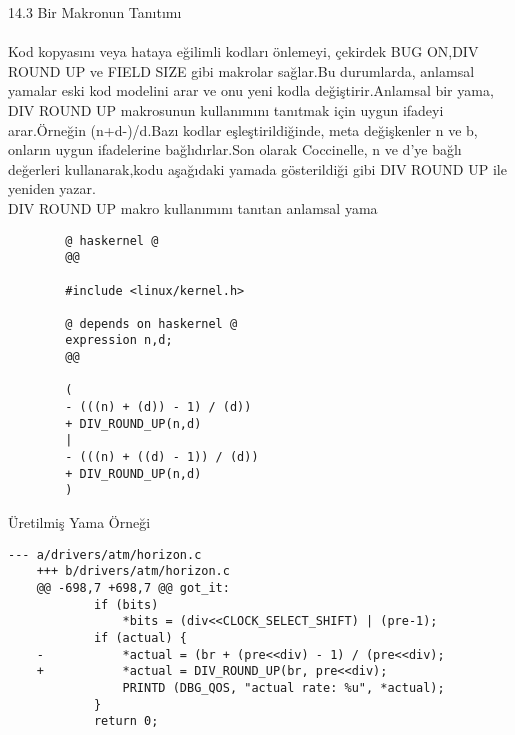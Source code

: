 \documentclass[24pt]{article}
\begin{document}
14.3 Bir Makronun Tanıtımı\\
\\
Kod kopyasını veya hataya eğilimli kodları önlemeyi, çekirdek BUG ON,DIV ROUND UP ve FIELD SIZE gibi makrolar sağlar.Bu durumlarda, anlamsal yamalar eski kod modelini arar ve onu yeni kodla değiştirir.Anlamsal bir yama, DIV ROUND UP makrosunun kullanımını tanıtmak için uygun ifadeyi arar.Örneğin (n+d-)/d.Bazı kodlar eşleştirildiğinde, meta değişkenler n ve b, onların uygun ifadelerine bağlıdırlar.Son olarak Coccinelle, n ve d'ye bağlı değerleri kullanarak,kodu aşağıdaki yamada gösterildiği gibi DIV ROUND UP ile yeniden yazar.\\

DIV ROUND UP makro kullanımını tanıtan anlamsal yama\\

\begin{lstlisting}
		@ haskernel @
		@@

		#include <linux/kernel.h>

		@ depends on haskernel @
		expression n,d;
		@@

		(
		- (((n) + (d)) - 1) / (d))
		+ DIV_ROUND_UP(n,d)
		|
		- (((n) + ((d) - 1)) / (d))
		+ DIV_ROUND_UP(n,d)
		)
\end{lstlisting}
Üretilmiş Yama Örneği\\
\begin{lstlisting}
--- a/drivers/atm/horizon.c
	+++ b/drivers/atm/horizon.c
	@@ -698,7 +698,7 @@ got_it:
			if (bits)
				*bits = (div<<CLOCK_SELECT_SHIFT) | (pre-1);
			if (actual) {
	-			*actual = (br + (pre<<div) - 1) / (pre<<div);
	+			*actual = DIV_ROUND_UP(br, pre<<div);
				PRINTD (DBG_QOS, "actual rate: %u", *actual);
			}
			return 0;
\end{lstlisting}
\end{document}

